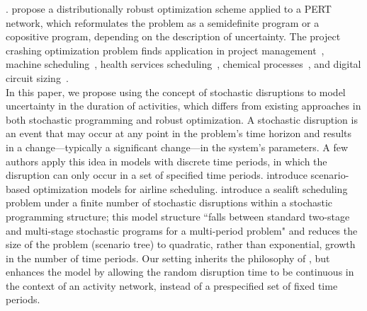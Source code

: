 \documentclass[11pt]{article}
\begin{document}
		\citep{wiesemann2012robust}. \citet{ahipasaoglu2016distributionally} propose a distributionally robust optimization scheme applied to a PERT network, which reformulates the problem as a semidefinite program or a copositive program, depending on the description of uncertainty. The project crashing optimization problem finds application in project management~\citep{demeulemeester2006project, jaselskis1991allocation,tonchia2018industrial}, machine scheduling~\citep{blazewicz1983scheduling,hall1996machine}, health services scheduling~\citep{cardoen2010operating}, chemical processes~\citep{li2008process}, and digital circuit sizing~\citep{kim2007heuristic}.\\
		\newline
		In this paper, we propose using the concept of stochastic disruptions to model uncertainty in the duration of activities, which differs from existing approaches in both stochastic programming and robust optimization. A stochastic disruption is an event that may occur at any point in the problem's time horizon and results in a change---typically a significant change---in the system's parameters. A few authors apply this idea in models with discrete time periods, in which the disruption can only occur in a set of specified time periods. \citet{yu2004disruptionmgt} introduce scenario-based optimization models for airline scheduling. \citet{morton2009sealift} introduce a sealift scheduling problem under a finite number of stochastic disruptions within a stochastic programming structure; this model structure ``falls between standard two-stage and multi-stage stochastic programs for a multi-period problem" and reduces the size of the problem (scenario tree) to quadratic, rather than exponential, growth in the number of time periods. Our setting inherits the philosophy of \citet{morton2009sealift}, but enhances the model by allowing the random disruption time to be continuous in the context of an activity network, instead of a prespecified set of fixed time periods. \\
		\newline
\end{document}
